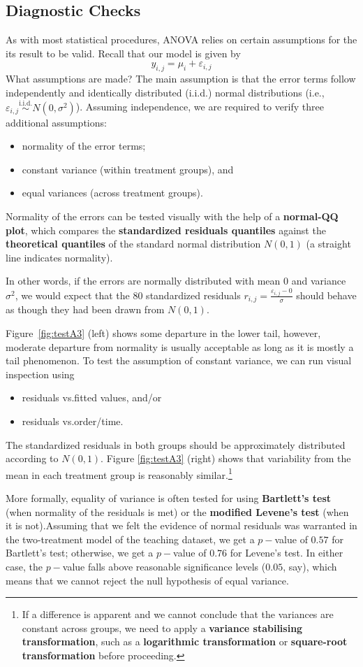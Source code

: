 \subsection{Diagnostic Checks}
As with most statistical procedures, ANOVA relies on certain assumptions for the its result to be valid. Recall that our model is given by
$$
    y_{i,j}=\mu_{i}+\varepsilon_{i,j}
$$
What assumptions are made? The main assumption is that the error terms follow independently and identically distributed ({i.i.d.}) normal distributions (i.e., $\varepsilon_{i,j}\stackrel{\text{i.i.d.}}{\sim}N(0,\sigma^{2})$). \newpage\noindent Assuming independence, we are required to verify three additional assumptions:
\begin{itemize}[noitemsep]
    \item normality of the error terms;
    \item constant variance (within treatment groups), and
    \item equal variances (across treatment groups).
\end{itemize}
Normality of the errors can be tested visually with the help of a \textbf{normal-QQ plot}, which compares the \textbf{standardized residuals quantiles} against the \textbf{theoretical quantiles} of the standard normal distribution $N(0,1)$ (a straight line indicates normality).\par In other words, if the errors are normally distributed with mean $0$ and variance $\sigma^2$, we would expect that the $80$ standardized residuals $r_{i,j}=\frac{\varepsilon_{i,j}-0}{\sigma}$ should behave as though they had been drawn from $N(0,1)$.\par  Figure~\ref{fig:testA3} (left) shows some departure in the lower tail, however, moderate departure from normality is usually acceptable as long as it is mostly a tail phenomenon.
\newl To test the assumption of constant variance, we can run visual inspection using  \begin{itemize} [noitemsep]
\item residuals vs.\@ fitted values, and/or 
\item residuals vs.\@ order/time. 
\end{itemize}
The standardized residuals in both groups should be approximately distributed according to $N(0,1)$. Figure \ref{fig:testA3} (right) shows that variability from the mean in each treatment group is reasonably similar.\footnote{If a difference is apparent and we cannot conclude that the variances are constant across groups, we need to apply a \textbf{variance stabilising transformation}, such as a \textbf{logarithmic transformation} or \textbf{square-root transformation} before proceeding.} \par More formally, equality of variance is often tested for using \textbf{Bartlett's test} (when normality of the residuals is met) or the \textbf{modified Levene's test} (when it is not).\newl Assuming that we felt the evidence of normal residuals was warranted in the two-treatment model of the teaching dataset, we get a $p-$value of $0.57$ for Bartlett's test; otherwise, we get a $p-$value  of $0.76$ for Levene's test. In either case, the $p-$value falls above reasonable significance levels ($0.05$, say), which means that we cannot reject the null hypothesis of equal variance. 
